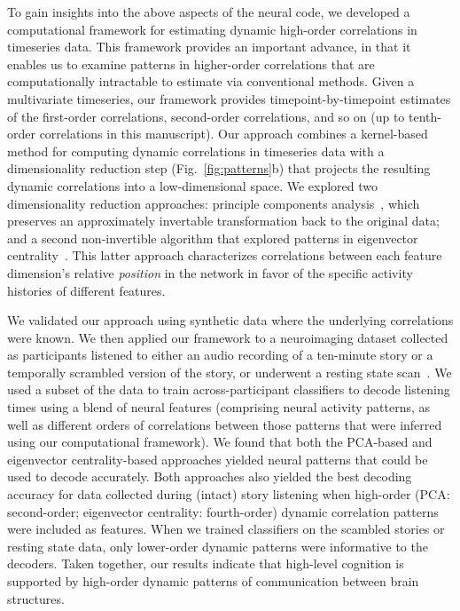 \documentclass[english]{article}
\begin{document}
To gain insights into the above aspects of the neural code, we
developed a computational framework for estimating dynamic high-order
correlations in timeseries data. This framework provides an important
advance, in that it enables us to examine patterns in higher-order
correlations that are computationally intractable to estimate via
conventional methods.  Given a multivariate timeseries, our framework
provides timepoint-by-timepoint estimates of the first-order
correlations, second-order correlations, and so on (up to tenth-order
correlations in this manuscript).  Our approach combines a
kernel-based method for computing dynamic correlations in timeseries
data with a dimensionality reduction step (Fig.~\ref{fig:patterns}b)
that projects the resulting dynamic correlations into a
low-dimensional space.  We explored two dimensionality reduction
approaches: principle components analysis~\citep[PCA;][]{Pear01},
which preserves an approximately invertable transformation back to the
original data; and a second non-invertible algorithm that explored
patterns in eigenvector centrality~\citep{Land95}.  This latter
approach characterizes correlations between each feature dimension's
relative \textit{position} in the network in favor of the specific
activity histories of different features.

We validated our approach using synthetic data where the underlying
correlations were known.  We then applied our framework to a
neuroimaging dataset collected as participants
listened to either an audio recording of a ten-minute story or a
temporally scrambled version of the story, or underwent a resting
state scan~\citep{SimoEtal16}.  We used a subset of the data to train
across-participant classifiers to decode listening times using a blend
of neural features (comprising neural activity patterns, as well as
different orders of correlations between those patterns that were
inferred using our computational framework).  We found that both the
PCA-based and eigenvector centrality-based approaches yielded neural
patterns that could be used to decode accurately.  Both approaches
also yielded the best decoding accuracy for data collected during
(intact) story listening when high-order (PCA: second-order;
eigenvector centrality: fourth-order) dynamic correlation patterns
were included as features.  When we trained classifiers on the
scambled stories or resting state data, only lower-order dynamic
patterns were informative to the decoders.  Taken together, our
results indicate that high-level cognition is supported by high-order
dynamic patterns of communication between brain structures.
\end{document}
